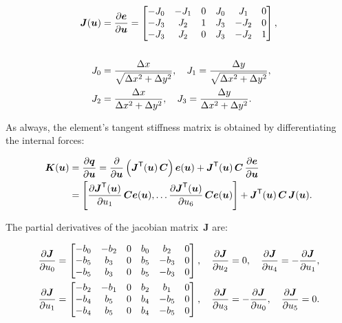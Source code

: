 \begin{align}
\boldsymbol{J}(\boldsymbol{u}) &= \frac{\partial \boldsymbol{e}}{\partial \boldsymbol{u}} =
\begin{bmatrix}
-J_{0} & -J_{1} & 0 & J_{0} & J_{1} & 0\\
-J_{3} & J_{2} & 1 & J_{3} & -J_{2} & 0\\
-J_{3} & J_{2} & 0 & J_{3} & -J_{2} & 1
\end{bmatrix},\\
\notag\\
J_{0} &= \frac{\Delta x}{\sqrt{\Delta x^2 + \Delta y^2}},\quad J_{1} = \frac{\Delta y}{\sqrt{\Delta x^2 + \Delta y^2}},\notag\\
\quad J_{2} &= \frac{\Delta x}{\Delta x^2 + \Delta y^2},\quad J_{3} = \frac{\Delta y}{\Delta x^2 + \Delta y^2}.
\end{align}

As always, the element's tangent stiffness matrix is obtained by differentiating the internal forces:

\begin{align}
\boldsymbol{K}(\boldsymbol{u}) &= \frac{\partial \boldsymbol{q}}{\partial \boldsymbol{u}} = \frac{\partial}{\partial \boldsymbol{u}}\left(\boldsymbol{J}^\mathsf{T}(\boldsymbol{u})\,\boldsymbol{C}\right)\boldsymbol{e}(\boldsymbol{u}) + \boldsymbol{J}^\mathsf{T}(\boldsymbol{u})\,\boldsymbol{C}\,\frac{\partial \boldsymbol{e}}{\partial \boldsymbol{u}}\notag\\
&= \left[\frac{\partial \boldsymbol{J}^\mathsf{T}(\boldsymbol{u})}{\partial u_{1}}\,\boldsymbol{C}\boldsymbol{e}(\boldsymbol{u}),\ldots \frac{\partial \boldsymbol{J}^\mathsf{T}(\boldsymbol{u})}{\partial u_{6}}\,\boldsymbol{C}\boldsymbol{e}(\boldsymbol{u})\right] + \boldsymbol{J}^\mathsf{T}(\boldsymbol{u})\,\boldsymbol{C}\,\boldsymbol{J}(\boldsymbol{u}).
\end{align}

The partial derivatives of the jacobian matrix~$\boldsymbol{J}$ are:

\begin{align}
\frac{\partial \boldsymbol{J}}{\partial u_0} &=
\begin{bmatrix}
-b_{0} & -b_{2} & 0 & b_{0} &  b_{2} & 0\\
-b_{5} &  b_{3} & 0 & b_{5} & -b_{3} & 0\\
-b_{5} &  b_{3} & 0 & b_{5} & -b_{3} & 0
\end{bmatrix},\quad
\frac{\partial \boldsymbol{J}}{\partial u_2} = 0,\quad
\frac{\partial \boldsymbol{J}}{\partial u_4} = -\frac{\partial \boldsymbol{J}}{\partial u_1},\notag\\
\frac{\partial \boldsymbol{J}}{\partial u_1} &=
\begin{bmatrix}
-b_{2} & -b_{1} & 0 & b_{2} &  b_{1} & 0\\
-b_{4} &  b_{5} & 0 & b_{4} & -b_{5} & 0\\
-b_{4} &  b_{5} & 0 & b_{4} & -b_{5} & 0
\end{bmatrix},\quad
\frac{\partial \boldsymbol{J}}{\partial u_3} = -\frac{\partial \boldsymbol{J}}{\partial u_0},\quad
\frac{\partial \boldsymbol{J}}{\partial u_5} = 0.
\end{align}

